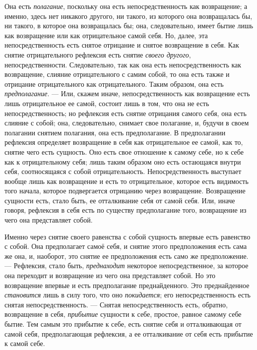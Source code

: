 Она есть {\em полагание}, поскольку она есть
непосредственность как возвращение; а именно, здесь нет никакого другого,
ни такого, из которого она возвращалась бы, ни такого, в которое она
возвращалась бы; она, следовательно, имеет бытие лишь как возвращение или
как отрицательное самой себя. Но, далее, эта непосредственность есть снятое
отрицание и снятое возвращение в себя. Как снятие отрицательного рефлексия
есть снятие {\em своего другого}, непосредственности.
Следовательно, так как она есть непосредственность как возвращение, слияние
отрицательного с самим собой, то она есть также и отрицание отрицательного
как отрицательного. Таким образом, она есть
{\em предполагание}. — Или, скажем иначе,
непосредственность как возвращение есть лишь отрицательное ее самой,
состоит лишь в том, что она не есть непосредственность; но рефлексия есть
снятие отрицания самого себя, она есть слияние с собой; она, следовательно,
снимает свое полагание, и, будучи в своем полагании снятием полагания, она
есть предполагание. В предполагании рефлексия определяет возвращение в себя
как отрицательное ее самой, как то, снятие чего есть сущность. Оно есть
свое отношение к самому себе, но к себе как к отрицательному себя; лишь
таким образом оно есть остающаяся внутри себя, соотносящаяся с собой
отрицательность. Непосредственность выступает вообще лишь как возвращение и
есть то отрицательное, которое есть видимость того начала, которое
подвергается отрицанию через возвращение. Возвращение сущности есть, стало
быть, ее отталкивание себя от самой себя. Или, иначе говоря, рефлексия в
себя есть по существу предполагание того, возвращение из чего она
представляет собой.

Именно через снятие своего равенства с собой сущность впервые есть равенство
с собой. Она предполагает самоё себя, и снятие этого предположения есть
сама же она, и, наоборот, это снятие ее предположения есть само же
предположение. — Рефлексия, стало быть,
{\em преднаходит} некоторое непосредственное, за
которое она переходит и возвращение из чего она представляет собой. Но это
возвращение впервые и есть предполагание преднайденного. Это преднайденное
{\em становится} лишь в силу того, что оно
{\em покидается}; его непосредственность есть снятая
непосредственность. — Снятая непосредственность есть, обратно, возвращение
в себя, {\em прибытие} сущности к себе, простое, равное
самому себе бытие. Тем самым это прибытие к себе, есть снятие себя и
отталкивающая от самой себя, предполагающая рефлексия, а ее отталкивание от
себя есть прибытие к самой себе.

